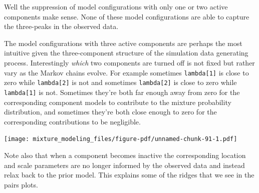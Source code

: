 \documentclass[
  letterpaper,
  DIV=11,
  numbers=noendperiod]{scrartcl}
\newenvironment{Shaded}{\begin{snugshade}}{\end{snugshade}}
\newcommand{\FunctionTok}[1]{\textcolor[rgb]{0.28,0.35,0.67}{#1}}
\newcommand{\NormalTok}[1]{\textcolor[rgb]{0.00,0.23,0.31}{#1}}
\newcommand{\SpecialCharTok}[1]{\textcolor[rgb]{0.37,0.37,0.37}{#1}}
\newcommand{\StringTok}[1]{\textcolor[rgb]{0.13,0.47,0.30}{#1}}
\begin{document}
Well the suppression of model configurations with only one or two active
components make sense. None of these model configurations are able to
capture the three-peaks in the observed data.

The model configurations with three active components are perhaps the
most intuitive given the three-component structure of the simulation
data generating process. Interestingly \emph{which} two components are
turned off is not fixed but rather vary as the Markov chains evolve. For
example sometimes \texttt{lambda{[}1{]}} is close to zero while
\texttt{lambda{[}2{]}} is not and sometimes \texttt{lambda{[}2{]}} is
close to zero while \texttt{lambda{[}1{]}} is not. Sometimes they're
both far enough away from zero for the corresponding component models to
contribute to the mixture probability distribution, and sometimes
they're both close enough to zero for the corresponding contributions to
be negligible.

\begin{Shaded}
\end{Shaded}

\texttt{[image: mixture\_modeling\_files/figure-pdf/unnamed-chunk-91-1.pdf]}

Note also that when a component becomes inactive the corresponding
location and scale parameters are no longer informed by the observed
data and instead relax back to the prior model. This explains some of
the ridges that we see in the pairs plots.
\end{document}
